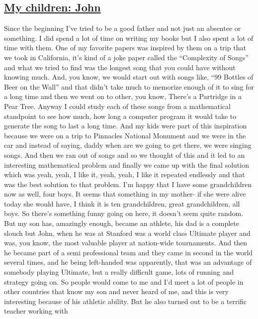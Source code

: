 \documentclass[]{article}
\begin{document}
\subsection{\texorpdfstring{\href{http://webofstories.com/play/17153}{My
children: John}}{My children: John}}\label{my-children-john}

Since the beginning I've tried to be a good father and not just an
absentee or something. I did spend a lot of time on writing my books but
I also spent a lot of time with them. One of my favorite papers was
inspired by them on a trip that we took in California, it's kind of a
joke paper called the ``Complexity of Songs'' and what we tried to find
was the longest song that you could have without knowing much. And, you
know, we would start out with songs like, ``99 Bottles of Beer on the
Wall'' and that didn't take much to memorize enough of it to sing for a
long time and then we went on to other, you know, There's a Partridge in
a Pear Tree. Anyway I could study each of these songs from a
mathematical standpoint to see how much, how long a computer program it
would take to generate the song to last a long time. And my kids were
part of this inspiration because we were on a trip to Pinnacles National
Monument and we were in the car and instead of saying, daddy when are we
going to get there, we were singing songs. And then we ran out of songs
and so we thought of this and it led to an interesting mathematical
problem and finally we came up with the final solution which was yeah,
yeah, I like it, yeah, yeah, I like it repeated endlessly and that was
the best solution to that problem. I'm happy that I have some
grandchildren now as well, four boys. It seems that something in my
mother- if she were alive today she would have, I think it is ten
grandchildren, great grandchildren, all boys. So there's something funny
going on here, it doesn't seem quite random. But my son has, amazingly
enough, became an athlete, his dad is a complete slouch but John, when
he was at Stanford was a world class Ultimate player and was, you know,
the most valuable player at nation-wide tournaments. And then he became
part of a semi professional team and they came in second in the world
several times, and he being left-handed was apparently, that was an
advantage of somebody playing Ultimate, but a really difficult game,
lots of running and strategy going on. So people would come to me and
I'd meet a lot of people in other countries that know my son and never
heard of me, and this is very interesting because of his athletic
ability. But he also turned out to be a terrific teacher working with
\end{document}
